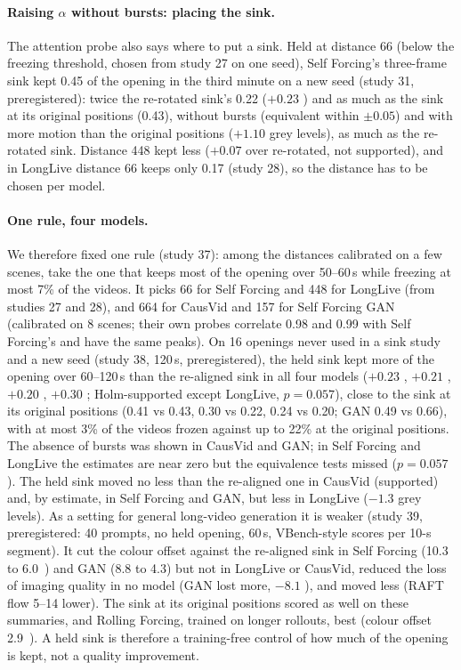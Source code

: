 \paragraph{Raising $\alpha$ without bursts: placing the sink.} The attention probe also says where to put a sink. Held
at distance 66 (below the freezing threshold, chosen from study 27 on one seed), Self Forcing's three-frame sink kept 0.45  of the opening in the third minute on a new seed (study 31, preregistered):
twice the re-rotated sink's 0.22 ($+0.23$ ) and as much as the sink at its original positions (0.43),
without bursts (equivalent within $\pm0.05$) and with more motion than the original positions
($+1.10$  grey levels), as much as the re-rotated sink. Distance 448 kept less ($+0.07$
 over re-rotated, not supported), and in LongLive distance 66 keeps only 0.17 (study 28), so the
distance has to be chosen per model.

\paragraph{One rule, four models.} We therefore fixed one rule (study 37): among the distances calibrated on a few
scenes, take the one that keeps most of the opening over 50--60\,s while freezing at most 7\% of the videos. It picks 66
for Self Forcing and 448 for LongLive (from studies 27 and 28), and 664 for CausVid and 157 for Self Forcing GAN
(calibrated on 8 scenes; their own probes correlate 0.98 and 0.99 with Self Forcing's and have the same peaks). On 16
openings never used in a sink study and a new seed (study 38, 120\,s, preregistered), the held sink kept more of the
opening over 60--120\,s than the re-aligned sink in all four models ($+0.23$ , $+0.21$ ,
$+0.20$ , $+0.30$ ; Holm-supported except LongLive, $p=0.057$), close to the sink at its
original positions (0.41 vs 0.43, 0.30 vs 0.22, 0.24 vs 0.20; GAN 0.49 vs 0.66), with at most 3\% of the videos
frozen against up to 22\% at the original positions. The absence of bursts was shown in CausVid and GAN; in Self
Forcing and LongLive the estimates are near zero but the equivalence tests missed ($p=0.057$). The held sink moved no
less than the re-aligned one in CausVid (supported) and, by estimate, in Self Forcing and GAN, but less in LongLive
($-1.3$ grey levels). As a setting for general long-video generation it is weaker (study 39, preregistered: 40 prompts,
no held opening, 60\,s, VBench-style scores per 10-s segment). It cut the colour offset against the re-aligned sink in
Self Forcing (10.3 to 6.0~\Lstar) and GAN (8.8 to 4.3) but not in LongLive or CausVid, reduced the loss of imaging
quality in no model (GAN lost more, $-8.1$ ), and moved less (RAFT flow 5--14 lower). The sink at its
original positions scored as well on these summaries, and Rolling Forcing, trained on longer rollouts, best (colour
offset 2.9~\Lstar). A held sink is therefore a training-free control of how much of the opening is kept, not a quality
improvement.

